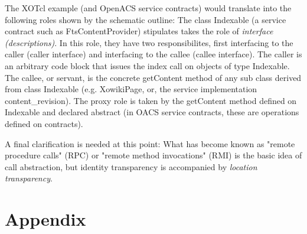 The XOTcl example (and OpenACS service contracts) would translate into the following roles shown by the schematic outline: The class Indexable (a service contract such as FtsContentProvider) stipulates takes the role of \emph{interface (descriptions)}. In this role, they have two responsibilites, first interfacing to the caller (caller interface) and interfacing to the callee (callee interface). The caller is an arbitrary code block that issues the index call on objects of type Indexable. The callee, or servant, is the concrete getContent method of any sub class derived from class Indexable (e.g. XowikiPage, or, the service implementation content\_revision). The proxy role is taken by the getContent method defined on Indexable and declared abstract (in OACS service contracts, these are operations defined on contracts).

A final clarification is needed at this point: What has become known as "remote procedure calls" (RPC) or "remote method invocations" (RMI) is the basic idea of call abstraction, but identity transparency is accompanied by \emph{location transparency}.

  \section{Appendix} 
